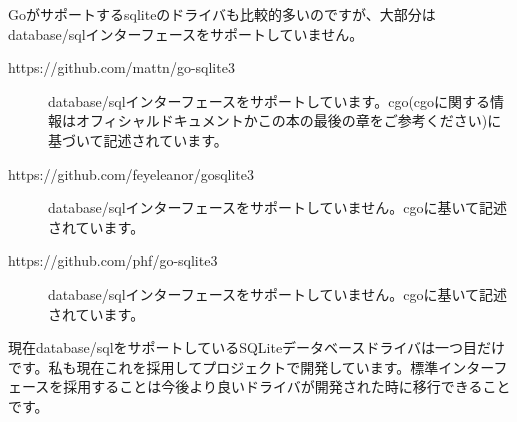 Goがサポートするsqliteのドライバも比較的多いのですが、大部分はdatabase/sqlインターフェースをサポートしていません。

\begin{description}
  \item[https://github.com/mattn/go-sqlite3] database/sqlインターフェースをサポートしています。cgo(cgoに関する情報はオフィシャルドキュメントかこの本の最後の章をご参考ください)に基づいて記述されています。
  \item[https://github.com/feyeleanor/gosqlite3] database/sqlインターフェースをサポートしていません。cgoに基いて記述されています。
  \item[https://github.com/phf/go-sqlite3] database/sqlインターフェースをサポートしていません。cgoに基いて記述されています。
\end{description}

現在database/sqlをサポートしているSQLiteデータベースドライバは一つ目だけです。私も現在これを採用してプロジェクトで開発しています。標準インターフェースを採用することは今後より良いドライバが開発された時に移行できることです。

